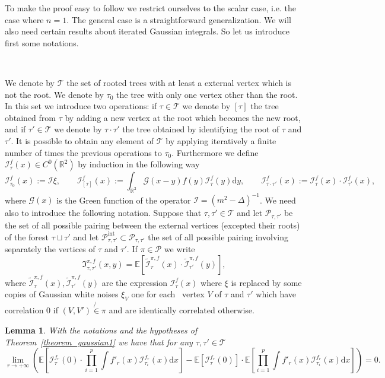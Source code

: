 \documentclass[a4paper,10pt]{article}
\newcommand{\assign}{:=}
\newcommand{\mathd}{\mathrm{d}}
\newcommand{\tmop}[1]{\ensuremath{\operatorname{#1}}}
\newtheorem{lemma}{Lemma}
\begin{document}
To make the proof easy to follow we restrict ourselves to the scalar case,
i.e. the case where $n = 1$. The general case is a straightforward
generalization. We will also need certain results about iterated Gaussian
integrals. So let us introduce first some notations.

\

We denote by $\mathcal{T}$ the set of rooted trees with at least a external
vertex which is not the root. We denote by $\tau_0$ the tree with only one
vertex other than the root. In this set we introduce two operations: if $\tau
\in \mathcal{T}$ we denote by $[\tau]$ the tree obtained from $\tau$ by adding
a new vertex at the root which becomes the new root, and if $\tau' \in
\mathcal{T}$ we denote by $\tau \cdot \tau'$ the tree obtained by identifying
the root of $\tau$ and $\tau'$. It is possible to obtain any element of
$\mathcal{T}$ by applying iteratively a finite number of times the previous
operations to $\tau_0$. Furthermore we define $\mathcal{I}^f_{\tau} (x) \in
C^0 (\mathbb{R}^2)$ by induction in the following way
\[ \mathcal{I}^f_{\tau_0} (x) \assign \mathcal{I} \xi, \qquad
   \mathcal{I}^f_{[\tau]} (x) \assign \int_{\mathbb{R}^2} \mathcal{G} (x - y)
   f (y) \mathcal{I}^f_{\tau} (y) \mathd y, \qquad \mathcal{I}^f_{\tau \cdot
   \tau'} (x) \assign \mathcal{I}^f_{\tau} (x) \cdot \mathcal{I}^f_{\tau'}
   (x), \]
where $\mathcal{G} (x)$ is the Green function of the operator $\mathcal{I}=
(m^2 - \Delta)^{- 1}$. We need also to introduce the following notation.
Suppose that $\tau, \tau' \in \mathcal{T}$ and let $\mathcal{P}_{\tau, \tau'}$
be the set of all possible pairing between the external vertices (excepted
their roots) of the forest $\tau \sqcup \tau'$ and let
$\mathcal{P}^{\tmop{int}}_{\tau, \tau'} \subset \mathcal{P}_{\tau, \tau'}$ the
set of all possible pairing involving separately the vertices of $\tau$ and
$\tau'$. If $\pi \in \mathcal{P}$ we write
\[ \mathfrak{I}^{\pi, f}_{\tau, \tau'} (x, y) =\mathbb{E}
   [\widetilde{\mathcal{I}}^{\pi, f}_{\tau} (x) \cdot
   \widetilde{\mathcal{I}}^{\pi, f}_{\tau'} (y)], \]
where $\widetilde{\mathcal{I}}^{\pi, f}_{\tau} (x),
\widetilde{\mathcal{I}}^{\pi, f}_{\tau'} (y)$ are the expression
$\mathcal{I}^f_{\tau} (x)$ where $\xi$ is replaced by some copies of Gaussian
white noises $\xi_V$ one for each \ vertex $V$ of $\tau$ and $\tau'$ which
have correlation $0$ if $(V, V') \not{\in} \pi$ and are identically correlated
otherwise.

\begin{lemma}
  \label{lemma_gaussian1}With the notations and the hypotheses of
  Theorem~\ref{theorem_gaussian1} we have that for any $\tau, \tau' \in
  \mathcal{T}$
  \[ \lim_{r \rightarrow + \infty} \left( \mathbb{E} \left[
     \mathcal{I}^{f_r}_{\tau} (0) \cdot \prod_{i = 1}^p \int f'_r (x)
     \mathcal{I}^{f_r}_{\tau_i} (x) \mathd x \right] -\mathbb{E}
     [\mathcal{I}^{f_r}_{\tau} (0)] \cdot \mathbb{E} \left[ \prod_{i = 1}^p
     \int f'_r (x) \mathcal{I}^{f_r}_{\tau_i} (x) \mathd x \right] \right) =
     0. \]
\end{lemma}
\end{document}
